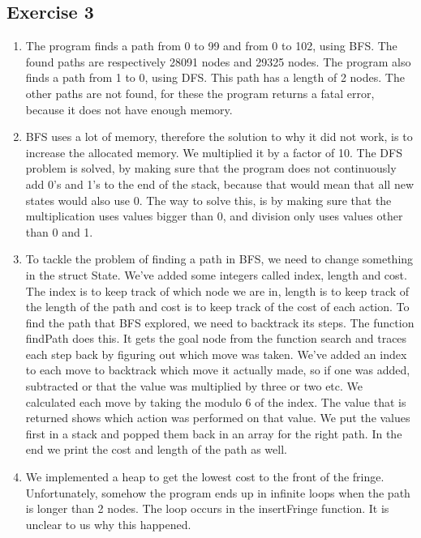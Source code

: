 \documentclass{article}
\begin{document}
	\subsection*{Exercise 3}
	\begin{enumerate}
		\item The program finds a path from 0 to 99 and from 0 to 102, using BFS. The found paths are respectively 28091 nodes and 29325 nodes. The program also finds a path from 1 to 0, using DFS. This path has a length of 2 nodes. The other paths are not found, for these the program returns a fatal error, because it does not have enough memory. 
		
		\item BFS uses a lot of memory, therefore the solution to why it did not work, is to increase the allocated memory.  We multiplied it by a factor of 10. The DFS problem is solved, by making sure that the program does not continuously add 0's and 1's to the end of the stack, because that would mean that all new states would also use 0. The way to solve this, is by making sure that the multiplication uses values bigger than 0, and division only uses values other than 0 and 1.
		
		\item To tackle the problem of finding a path in BFS, we need to change something in the struct State. We've added some integers called index, length and cost. The index is to keep track of which node we are in, length is to keep track of the length of the path and cost is to keep track of the cost of each action. To find the path that BFS explored, we need to backtrack its steps. The function findPath does this. It gets the goal node from the function search and traces each step back by figuring out which move was taken. We've added an index to each move to backtrack which move it actually made, so if one was added, subtracted or that the value was multiplied by three or two etc. We calculated each move by taking the modulo 6 of the index. The value that is returned shows which action was performed on that value. We put the values first in a stack and popped them back in an array for the right path. In the end we print the cost and length of the path as well.
		
		\item We implemented a heap to get the lowest cost to the front of the fringe. Unfortunately, somehow the program ends up in infinite loops when the path is longer than 2 nodes. The loop occurs in the insertFringe function. It is unclear to us why this happened.
		

\end{enumerate}
\end{document}
